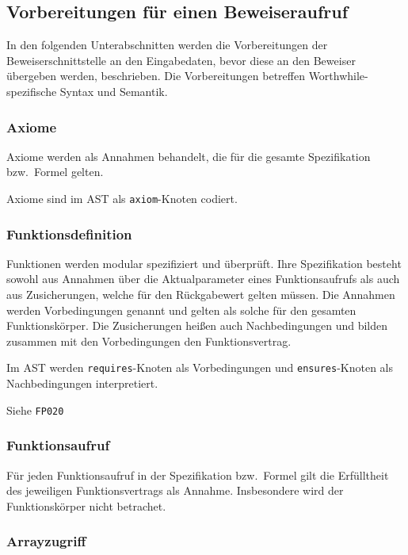 \subsection{Vorbereitungen für einen Beweiseraufruf}%

In den folgenden Unterabschnitten werden die Vorbereitungen der
Beweiserschnittstelle an den Eingabedaten, bevor diese an den
Beweiser übergeben werden, beschrieben. Die Vorbereitungen
betreffen Worthwhile-spezifische Syntax und Semantik.%

\subsubsection{Axiome}%

Axiome werden als Annahmen behandelt, die für die gesamte
Spezifikation bzw.\ Formel gelten.%

Axiome sind im AST als \texttt{axiom}-Knoten codiert.%

\subsubsection{Funktionsdefinition}%

Funktionen werden modular spezifiziert und überprüft. Ihre
Spezifikation besteht sowohl aus Annahmen über die Aktualparameter
eines Funktionsaufrufs als auch aus Zusicherungen, welche für den
Rückgabewert gelten müssen. Die Annahmen werden Vorbedingungen
genannt und gelten als solche für den gesamten Funktionskörper. Die
Zusicherungen heißen auch Nachbedingungen und bilden zusammen mit den
Vorbedingungen den Funktionsvertrag.%

Im AST werden \texttt{requires}-Knoten als Vorbedingungen und
\texttt{ensures}-Knoten als Nachbedingungen interpretiert.%

Siehe \texttt{FP020}%

\subsubsection{Funktionsaufruf}%

Für jeden Funktionsaufruf in der Spezifikation bzw.\ Formel gilt die
Erfülltheit des jeweiligen Funktionsvertrags als Annahme. Insbesondere
wird der Funktionskörper nicht betrachet.%

\subsubsection{Arrayzugriff}%

